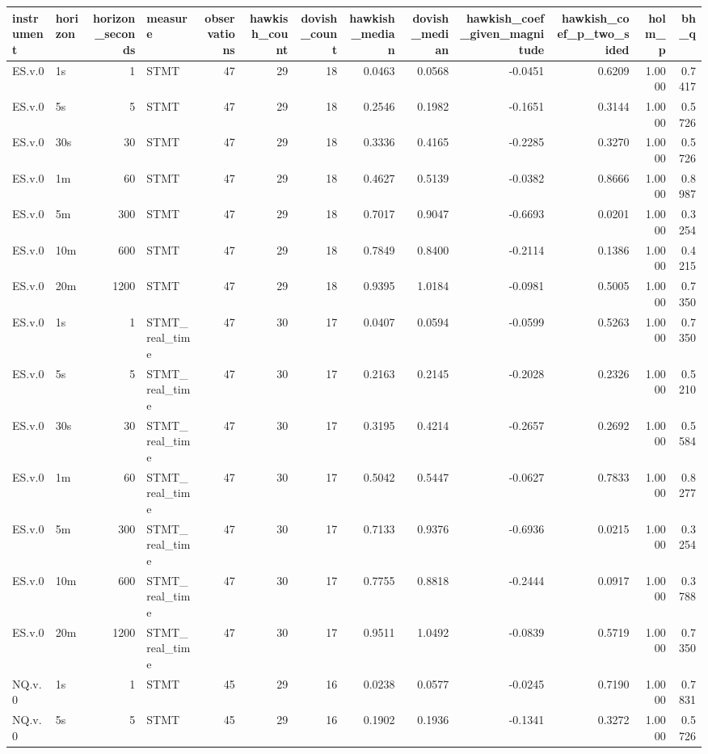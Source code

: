 \begin{tabular}{llrlrrrrrrrrr}
\toprule
instrument & horizon & horizon_seconds & measure & observations & hawkish_count & dovish_count & hawkish_median & dovish_median & hawkish_coef_given_magnitude & hawkish_coef_p_two_sided & holm_p & bh_q \\
\midrule
ES.v.0 & 1s & 1 & STMT & 47 & 29 & 18 & 0.0463 & 0.0568 & -0.0451 & 0.6209 & 1.0000 & 0.7417 \\
ES.v.0 & 5s & 5 & STMT & 47 & 29 & 18 & 0.2546 & 0.1982 & -0.1651 & 0.3144 & 1.0000 & 0.5726 \\
ES.v.0 & 30s & 30 & STMT & 47 & 29 & 18 & 0.3336 & 0.4165 & -0.2285 & 0.3270 & 1.0000 & 0.5726 \\
ES.v.0 & 1m & 60 & STMT & 47 & 29 & 18 & 0.4627 & 0.5139 & -0.0382 & 0.8666 & 1.0000 & 0.8987 \\
ES.v.0 & 5m & 300 & STMT & 47 & 29 & 18 & 0.7017 & 0.9047 & -0.6693 & 0.0201 & 1.0000 & 0.3254 \\
ES.v.0 & 10m & 600 & STMT & 47 & 29 & 18 & 0.7849 & 0.8400 & -0.2114 & 0.1386 & 1.0000 & 0.4215 \\
ES.v.0 & 20m & 1200 & STMT & 47 & 29 & 18 & 0.9395 & 1.0184 & -0.0981 & 0.5005 & 1.0000 & 0.7350 \\
ES.v.0 & 1s & 1 & STMT_real_time & 47 & 30 & 17 & 0.0407 & 0.0594 & -0.0599 & 0.5263 & 1.0000 & 0.7350 \\
ES.v.0 & 5s & 5 & STMT_real_time & 47 & 30 & 17 & 0.2163 & 0.2145 & -0.2028 & 0.2326 & 1.0000 & 0.5210 \\
ES.v.0 & 30s & 30 & STMT_real_time & 47 & 30 & 17 & 0.3195 & 0.4214 & -0.2657 & 0.2692 & 1.0000 & 0.5584 \\
ES.v.0 & 1m & 60 & STMT_real_time & 47 & 30 & 17 & 0.5042 & 0.5447 & -0.0627 & 0.7833 & 1.0000 & 0.8277 \\
ES.v.0 & 5m & 300 & STMT_real_time & 47 & 30 & 17 & 0.7133 & 0.9376 & -0.6936 & 0.0215 & 1.0000 & 0.3254 \\
ES.v.0 & 10m & 600 & STMT_real_time & 47 & 30 & 17 & 0.7755 & 0.8818 & -0.2444 & 0.0917 & 1.0000 & 0.3788 \\
ES.v.0 & 20m & 1200 & STMT_real_time & 47 & 30 & 17 & 0.9511 & 1.0492 & -0.0839 & 0.5719 & 1.0000 & 0.7350 \\
NQ.v.0 & 1s & 1 & STMT & 45 & 29 & 16 & 0.0238 & 0.0577 & -0.0245 & 0.7190 & 1.0000 & 0.7831 \\
NQ.v.0 & 5s & 5 & STMT & 45 & 29 & 16 & 0.1902 & 0.1936 & -0.1341 & 0.3272 & 1.0000 & 0.5726 \\

\end{tabular}

